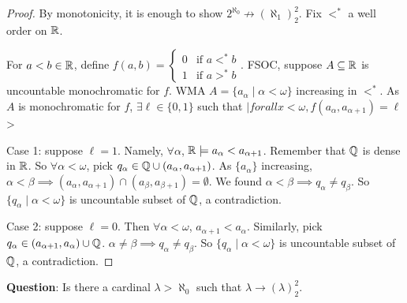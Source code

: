 \documentclass{report}
\begin{document}
\begin{proof}
    By monotonicity, it is enough to show $2^{\aleph_0} \not \to (\aleph_1)_2^2$. Fix $<^*$ a well order on $\RR$. 

    For $a < b \in \RR$, define $f(a, b) = \begin{cases} 0 & \text{if $a <^* b$} \\ 1 & \text{if $a >^* b$} \end{cases}$. FSOC, suppose $A \subseteq \RR$ is uncountable monochromatic for $f$. WMA $A = \{a_\alpha \mid \alpha < \omega\}$ increasing in $<^*$. As $A$ is monochromatic for $f$, $\exists \ell \in \{0, 1\}$ such that $|forall x < \omega, f(a_\alpha , a_{\alpha + 1}) = \ell$> 

    Case 1: suppose $\ell = 1$. Namely, $\forall \alpha$, $\RR \models a_{\alpha} < a_{\alpha + 1}$. Remember that $\QQ$ is dense in $\RR$. So $\forall \alpha < \omega$, pick $q_\alpha \in \QQ \cup (a_\alpha, a_{\alpha + 1})$. As $\{a_\alpha\}$ increasing, $\alpha < \beta \implies (a_\alpha, a_{\alpha + 1}) \cap (a_\beta, a_{\beta + 1}) = \emptyset$. We found $\alpha < \beta \implies q_\alpha \neq q_\beta$. So $\{q_\alpha \mid \alpha < \omega\}$ is uncountable subset of $\QQ$, a contradiction.

    Case 2: suppose $\ell = 0$. Then $\forall \alpha < \omega$, $a_{\alpha + 1} < a_\alpha$. Similarly, pick $q_\alpha \in (a_{\alpha + 1}, a_\alpha) \cup \QQ$. $\alpha \neq \beta \implies q_\alpha \neq q_\beta$. So $\{q_\alpha \mid \alpha < \omega\}$ is uncountable subset of $\QQ$, a contradiction.
\end{proof}
\noindent \textbf{Question}: Is there a cardinal $\lambda > \aleph_0$ such that $\lambda \to (\lambda)^2_2$. 

\end{document}
